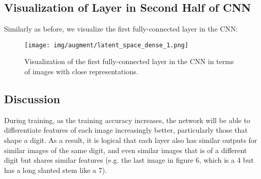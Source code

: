 \documentclass{article}
\begin{document}
\subsection{Visualization of Layer in Second Half of CNN}
Similarly as before, we visualize the first fully-connected layer in the CNN:

\begin{figure}[ht]
\centering
\texttt{[image: img/augment/latent\_space\_dense\_1.png]}
\caption{Visualization of the first fully-connected layer in the CNN in terms of images with close representations.}
\end{figure}

\subsection{Discussion}
During training, as the training accuracy increases, the network will be able to differentiate features of each image increasingly better, particularly those that shape a digit. As a result, it is logical that each layer also has similar outputs for similar images of the same digit, and even similar images that is of a different digit but shares similar features (e.g. the last image in figure 6, which is a 4 but has a long slanted stem like a 7).
\end{document}

